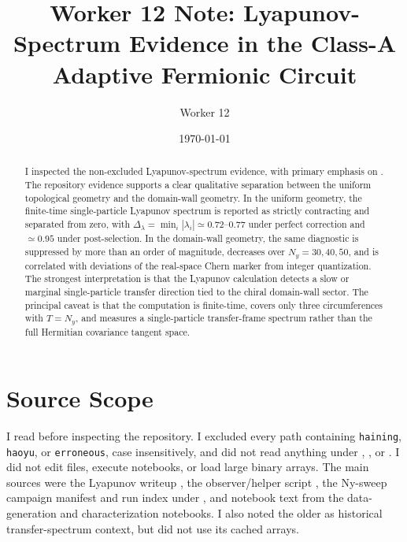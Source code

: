 \documentclass[aps,prb,onecolumn,nofootinbib,superscriptaddress]{revtex4-2}
\newcommand{\Dlambda}{\Delta_{\lambda}}
\begin{document}
\title{Worker 12 Note: Lyapunov-Spectrum Evidence in the Class-A Adaptive Fermionic Circuit}
\author{Worker 12}
\date{\today}

\begin{abstract}
I inspected the non-excluded Lyapunov-spectrum evidence, with primary emphasis on
.  The repository evidence supports a clear qualitative
separation between the uniform topological geometry and the domain-wall geometry.
In the uniform geometry, the finite-time single-particle Lyapunov spectrum is
reported as strictly contracting and separated from zero, with
$\Dlambda=\min_i|\lambda_i|\simeq 0.72$--$0.77$ under perfect correction and
$\simeq 0.95$ under post-selection.  In the domain-wall geometry, the same
diagnostic is suppressed by more than an order of magnitude, decreases over
$N_y=30,40,50$, and is correlated with deviations of the real-space Chern marker
from integer quantization.  The strongest interpretation is that the Lyapunov
calculation detects a slow or marginal single-particle transfer direction tied
to the chiral domain-wall sector.  The principal caveat is that the computation
is finite-time, covers only three circumferences with $T=N_y$, and measures a
single-particle transfer-frame spectrum rather than the full Hermitian
covariance tangent space.
\end{abstract}

\maketitle
\setcounter{tocdepth}{2}
\tableofcontents

\section{Source Scope}

I read  before inspecting the repository.  I excluded every
path containing \texttt{haining}, \texttt{haoyu}, or \texttt{erroneous}, case
insensitively, and did not read anything under
, , or
.  I did not edit files, execute notebooks, or load large binary
arrays.  The main sources were the Lyapunov writeup
, the observer/helper script
, the Ny-sweep campaign
manifest and run index under ,
and notebook text from the data-generation and characterization notebooks.  I
also noted the older 
as historical transfer-spectrum context, but did not use its cached arrays.
\end{document}
